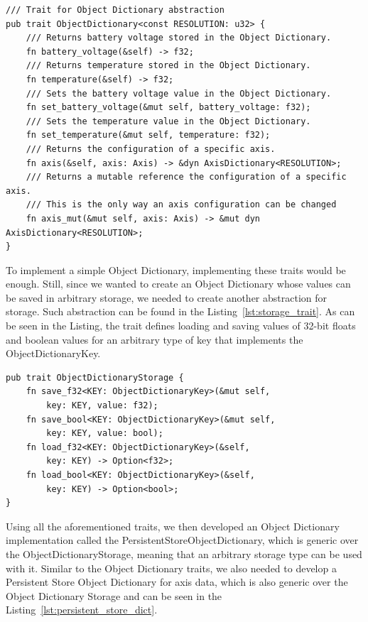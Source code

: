 \newpage
\begin{lstlisting}[caption={Trait for abstracting away the Object Dictionary.},label=lst:od_trait]
/// Trait for Object Dictionary abstraction
pub trait ObjectDictionary<const RESOLUTION: u32> {
    /// Returns battery voltage stored in the Object Dictionary.
    fn battery_voltage(&self) -> f32;
    /// Returns temperature stored in the Object Dictionary.
    fn temperature(&self) -> f32;
    /// Sets the battery voltage value in the Object Dictionary.
    fn set_battery_voltage(&mut self, battery_voltage: f32);
    /// Sets the temperature value in the Object Dictionary.
    fn set_temperature(&mut self, temperature: f32);
    /// Returns the configuration of a specific axis.
    fn axis(&self, axis: Axis) -> &dyn AxisDictionary<RESOLUTION>;
    /// Returns a mutable reference the configuration of a specific axis.
    /// This is the only way an axis configuration can be changed
    fn axis_mut(&mut self, axis: Axis) -> &mut dyn AxisDictionary<RESOLUTION>;
}
\end{lstlisting}

To implement a simple Object Dictionary, implementing these traits would be enough.
Still, since we wanted to create an Object Dictionary whose values can be saved in arbitrary storage, we needed to create another abstraction for storage.
Such abstraction can be found in the Listing~\ref{lst:storage_trait}.
As can be seen in the Listing, the trait defines loading and saving values of 32-bit floats and boolean values for an arbitrary type of key that implements the ObjectDictionaryKey.

\newpage
\begin{lstlisting}[caption={Trait for abstracting away the Object Dictionary storage.},label=lst:storage_trait]
pub trait ObjectDictionaryStorage {
    fn save_f32<KEY: ObjectDictionaryKey>(&mut self,
        key: KEY, value: f32);
    fn save_bool<KEY: ObjectDictionaryKey>(&mut self,
        key: KEY, value: bool);
    fn load_f32<KEY: ObjectDictionaryKey>(&self,
        key: KEY) -> Option<f32>;
    fn load_bool<KEY: ObjectDictionaryKey>(&self,
        key: KEY) -> Option<bool>;
}
\end{lstlisting}

Using all the aforementioned traits, we then developed an Object Dictionary implementation called the PersistentStoreObjectDictionary, which is generic over the ObjectDictionaryStorage, meaning that an arbitrary storage type can be used with it.
Similar to the Object Dictionary traits, we also needed to develop a Persistent Store Object Dictionary for axis data, which is also generic over the Object Dictionary Storage and can be seen in the Listing~\ref{lst:persistent_store_dict}.

